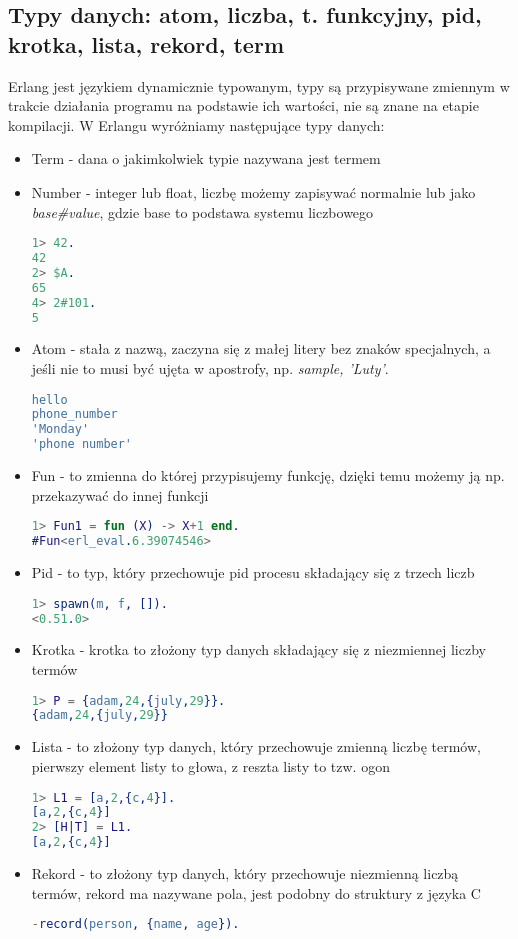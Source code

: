 \documentclass[a4paper,15pt]{article}
\begin{document}
\subsection{Typy danych: atom, liczba, t. funkcyjny, pid, krotka, lista, rekord, term}
Erlang jest językiem dynamicznie typowanym, typy są przypisywane zmiennym w trakcie działania programu na podstawie ich wartości, nie są znane na etapie kompilacji. W Erlangu wyróżniamy następujące typy danych:
\begin{itemize}
\item Term - dana o jakimkolwiek typie nazywana jest termem
\item Number - integer lub float, liczbę możemy zapisywać normalnie lub jako \textit{base\#value}, gdzie base to podstawa systemu liczbowego
\begin{lstlisting}[language=Erlang]
1> 42.
42
2> $A.
65
4> 2#101.
5
\end{lstlisting}
\item Atom - stała z nazwą, zaczyna się z małej litery bez znaków specjalnych, a jeśli nie to musi być ujęta w apostrofy, np. \textit{sample, 'Luty'}.
\begin{lstlisting}[language=Erlang]
hello
phone_number
'Monday'
'phone number'
\end{lstlisting}
\item Fun - to zmienna do której przypisujemy funkcję, dzięki temu możemy ją np. przekazywać do innej funkcji
\begin{lstlisting}[language=Erlang]
1> Fun1 = fun (X) -> X+1 end.
#Fun<erl_eval.6.39074546>
\end{lstlisting}
\item Pid - to typ, który przechowuje pid procesu składający się z trzech liczb
\begin{lstlisting}[language=Erlang]
1> spawn(m, f, []).
<0.51.0>
\end{lstlisting}
\item Krotka - krotka to złożony typ danych składający się z niezmiennej liczby termów
\begin{lstlisting}[language=Erlang]
1> P = {adam,24,{july,29}}.
{adam,24,{july,29}}
\end{lstlisting}
\item Lista - to złożony typ danych, który przechowuje zmienną liczbę termów, pierwszy element listy to głowa, z reszta listy to tzw. ogon
\begin{lstlisting}[language=Erlang]
1> L1 = [a,2,{c,4}].
[a,2,{c,4}]
2> [H|T] = L1.
[a,2,{c,4}]
\end{lstlisting}
\item Rekord - to złożony typ danych, który przechowuje niezmienną liczbą termów, rekord ma nazywane pola, jest podobny do struktury z języka C
\begin{lstlisting}[language=Erlang]
-record(person, {name, age}).


\end{lstlisting}
\end{itemize}
\end{document}
